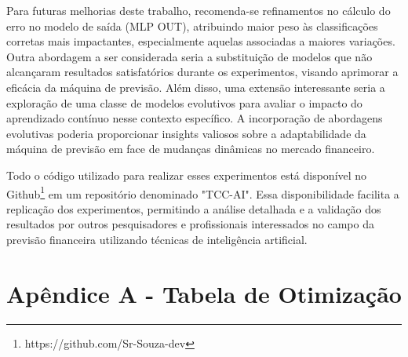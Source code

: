 Para futuras melhorias deste trabalho, recomenda-se refinamentos no cálculo do erro no modelo de saída (\ac{MLP} OUT), atribuindo maior peso às classificações corretas mais impactantes, especialmente aquelas associadas a maiores variações. Outra abordagem a ser considerada seria a substituição de modelos que não alcançaram resultados satisfatórios durante os experimentos, visando aprimorar a eficácia da máquina de previsão.
Além disso, uma extensão interessante seria a exploração de uma classe de modelos evolutivos para avaliar o impacto do aprendizado contínuo nesse contexto específico. A incorporação de abordagens evolutivas poderia proporcionar insights valiosos sobre a adaptabilidade da máquina de previsão em face de mudanças dinâmicas no mercado financeiro.

Todo o código utilizado para realizar esses experimentos está disponível no Github\footnote{https://github.com/Sr-Souza-dev} em um repositório denominado "TCC-AI". Essa disponibilidade facilita a replicação dos experimentos, permitindo a análise detalhada e a validação dos resultados por outros pesquisadores e profissionais interessados no campo da previsão financeira utilizando técnicas de inteligência artificial.

\section*{Apêndice A - Tabela de Otimização}
\label{ap:tabelas}



